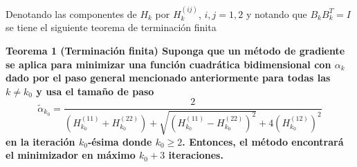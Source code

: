 Denotando las componentes de $H_k$ por $H_k^(ij)$, $i,j = 1,2$ y notando que $B_kB^T_k = I$ se tiene el siguiente teorema de terminación finita
\par \bf Teorema 1 (Terminación finita) \normalfont Suponga que un método de gradiente se aplica para minimizar una función cuadrática bidimensional con $\alpha_k$ dado por el paso general mencionado anteriormente para todas las $k\neq k_0$ y usa el tamaño de paso
$$
\tilde{\alpha}_{k_0} = \frac{2}{\left(H^{(11)}_{k_0} + H^{(22)}_{k_0}\right)+\sqrt{\left(H^{(11)}_{k_0} - H^{(22)}_{k_0}\right)^2 } + 4\left(H_{k_0}^{(12)}\right)^2}
$$
en la iteración $k_0$-ésima donde $k_0\geq 2$. Entonces, el método encontrará el minimizador en máximo $k_0+3$ iteraciones.
